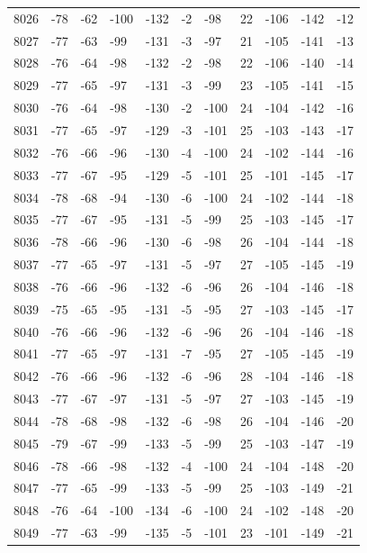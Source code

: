 \begin{table}[H]
\begin{tabular}{lllllllllll}
8026 & -78 & -62 & -100 & -132 & -2 & -98 & 22 & -106 & -142 & -12 \\
8027 & -77 & -63 & -99 & -131 & -3 & -97 & 21 & -105 & -141 & -13 \\
8028 & -76 & -64 & -98 & -132 & -2 & -98 & 22 & -106 & -140 & -14 \\
8029 & -77 & -65 & -97 & -131 & -3 & -99 & 23 & -105 & -141 & -15 \\
8030 & -76 & -64 & -98 & -130 & -2 & -100 & 24 & -104 & -142 & -16 \\
8031 & -77 & -65 & -97 & -129 & -3 & -101 & 25 & -103 & -143 & -17 \\
8032 & -76 & -66 & -96 & -130 & -4 & -100 & 24 & -102 & -144 & -16 \\
8033 & -77 & -67 & -95 & -129 & -5 & -101 & 25 & -101 & -145 & -17 \\
8034 & -78 & -68 & -94 & -130 & -6 & -100 & 24 & -102 & -144 & -18 \\
8035 & -77 & -67 & -95 & -131 & -5 & -99 & 25 & -103 & -145 & -17 \\
8036 & -78 & -66 & -96 & -130 & -6 & -98 & 26 & -104 & -144 & -18 \\
8037 & -77 & -65 & -97 & -131 & -5 & -97 & 27 & -105 & -145 & -19 \\
8038 & -76 & -66 & -96 & -132 & -6 & -96 & 26 & -104 & -146 & -18 \\
8039 & -75 & -65 & -95 & -131 & -5 & -95 & 27 & -103 & -145 & -17 \\
8040 & -76 & -66 & -96 & -132 & -6 & -96 & 26 & -104 & -146 & -18 \\
8041 & -77 & -65 & -97 & -131 & -7 & -95 & 27 & -105 & -145 & -19 \\
8042 & -76 & -66 & -96 & -132 & -6 & -96 & 28 & -104 & -146 & -18 \\
8043 & -77 & -67 & -97 & -131 & -5 & -97 & 27 & -103 & -145 & -19 \\
8044 & -78 & -68 & -98 & -132 & -6 & -98 & 26 & -104 & -146 & -20 \\
8045 & -79 & -67 & -99 & -133 & -5 & -99 & 25 & -103 & -147 & -19 \\
8046 & -78 & -66 & -98 & -132 & -4 & -100 & 24 & -104 & -148 & -20 \\
8047 & -77 & -65 & -99 & -133 & -5 & -99 & 25 & -103 & -149 & -21 \\
8048 & -76 & -64 & -100 & -134 & -6 & -100 & 24 & -102 & -148 & -20 \\
8049 & -77 & -63 & -99 & -135 & -5 & -101 & 23 & -101 & -149 & -21 \\

\end{tabular}
\end{table}
